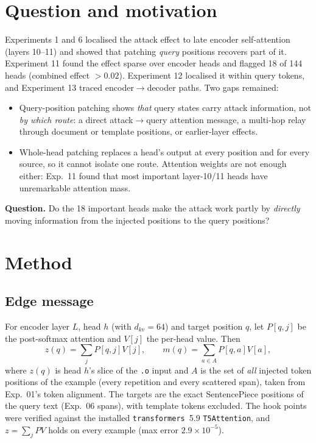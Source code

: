 \documentclass[11pt]{article}
\begin{document}
\section{Question and motivation}
Experiments 1 and 6 localised the attack effect to late encoder self-attention
(layers 10--11) and showed that patching \emph{query} positions recovers part
of it. Experiment 11 found the effect sparse over encoder heads and flagged
18 of 144 heads (combined effect $>0.02$). Experiment 12 localised it within
query tokens, and Experiment 13 traced encoder$\rightarrow$decoder paths. Two
gaps remained:
\begin{itemize}[nosep]
\item Query-position patching shows \emph{that} query states carry attack
  information, not \emph{by which route}: a direct attack$\rightarrow$query
  attention message, a multi-hop relay through document or template
  positions, or earlier-layer effects.
\item Whole-head patching replaces a head's output at every position and for
  every source, so it cannot isolate one route. Attention weights are not
  enough either: Exp.~11 found that most important layer-10/11 heads have
  unremarkable attention mass.
\end{itemize}
\textbf{Question.} Do the 18 important heads make the attack work partly by
\emph{directly} moving information from the injected positions to the query
positions?

\section{Method}
\subsection{Edge message}
For encoder layer $L$, head $h$ (with $d_{kv}=64$) and target position $q$,
let $P[q,j]$ be the post-softmax attention and $V[j]$ the per-head value.
Then
\[
z(q)=\sum_j P[q,j]V[j],\qquad m(q)=\sum_{a\in A}P[q,a]V[a],
\]
where $z(q)$ is head $h$'s slice of the \texttt{.o} input and $A$ is the set
of \emph{all} injected token positions of the example (every repetition and
every scattered span), taken from Exp.~01's token alignment. The targets are
the exact SentencePiece positions of the query text (Exp.~06 spans), with
template tokens excluded. The hook points were verified against the
installed \texttt{transformers}~5.9 \texttt{T5Attention}, and
$z=\sum_j PV$ holds on every example (max error $2.9\times10^{-5}$).
\end{document}
